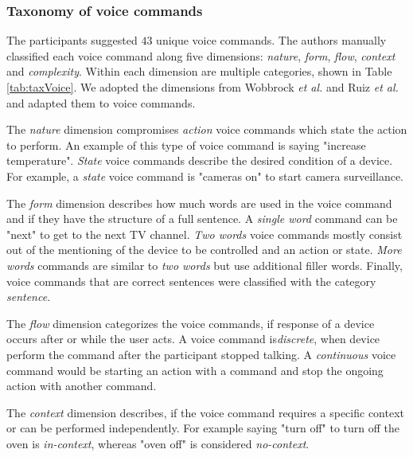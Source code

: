 \documentclass[sigchi]{acmart}
\begin{document}
	\subsubsection{Taxonomy of voice commands}
	The participants suggested $43$ unique voice commands. The authors manually classified each voice command along five dimensions: \textit{nature}, \textit{form}, \textit{flow}, \textit{context} and \textit{complexity}. Within each dimension are multiple categories, shown in Table \ref{tab:taxVoice}. We adopted the dimensions from Wobbrock \textit{et al.} \citep{Wobbrock.2009} and Ruiz \textit{et al.} \citep{Ruiz.2011} and adapted them to voice commands. 
	
	The \textit{nature} dimension compromises \textit{action} voice commands which state the action to perform. An example of this type of voice command is saying "increase temperature". \textit{State} voice commands describe the desired condition of a device. For example, a \textit{state} voice command is "cameras on" to start camera surveillance.
	
	The \textit{form} dimension describes how much words are used in the voice command and if they have the structure of a full sentence. A \textit{single word} command can be "next" to get to the next TV channel. \textit{Two words} voice commands mostly consist out of the mentioning of the device to be controlled and an action or state. \textit{More words} commands are similar to \textit{two words} but use additional filler words. Finally, voice commands that are correct sentences were classified with the category \textit{sentence}.
	
	The \textit{flow} dimension categorizes the voice commands, if response of a device occurs after or while the user acts. A voice command is\textit{discrete}, when device perform the command after the participant stopped talking. A \textit{continuous} voice command would be starting an action with a command and stop the ongoing action with another command.
	
	The \textit{context} dimension describes, if the voice command requires a specific context or can be performed independently. For example saying "turn off" to turn off the oven is \textit{in-context}, whereas "oven off" is considered \textit{no-context}.
	
\end{document}
